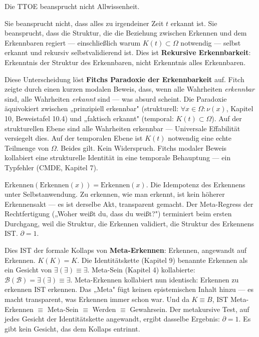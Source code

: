 \documentclass[10pt, openany, oneside]{book}
\begin{document}
\vspace{1em}

\noindent Die TTOE beansprucht nicht Allwissenheit.

Sie beansprucht nicht, dass alles zu irgendeiner Zeit $t$ erkannt ist. Sie beansprucht, dass die Struktur, die die Beziehung zwischen Erkennen und dem Erkennbaren regiert --- einschließlich warum $K(t) \subset \Omega$ notwendig --- selbst erkannt und rekursiv selbstvalidierend ist. Dies ist \textbf{Rekursive Erkennbarkeit}: Erkenntnis der Struktur des Erkennbaren, nicht Erkenntnis alles Erkennbaren.

Diese Unterscheidung löst \textbf{Fitchs Paradoxie der Erkennbarkeit} auf. Fitch zeigte durch einen kurzen modalen Beweis, dass, wenn alle Wahrheiten \textit{erkennbar} sind, alle Wahrheiten \textit{erkannt} sind --- was absurd scheint. Die Paradoxie äquivokiert zwischen „prinzipiell erkennbar" (strukturell: $\forall x \in \Omega: \nu(x)$, Kapitel 10, Beweistafel 10.4) und „faktisch erkannt" (temporal: $K(t) \subset \Omega$). Auf der strukturellen Ebene sind alle Wahrheiten erkennbar --- Universale Effabilität versiegelt dies. Auf der temporalen Ebene ist $K(t)$ notwendig eine echte Teilmenge von $\Omega$. Beides gilt. Kein Widerspruch. Fitchs modaler Beweis kollabiert eine strukturelle Identität in eine temporale Behauptung --- ein Typfehler (CMDE, Kapitel 7).

$\text{Erkennen}(\text{Erkennen}(x)) = \text{Erkennen}(x)$. Die Idempotenz des Erkennens unter Selbstanwendung. Zu erkennen, wie man erkennt, ist kein höherer Erkennensakt --- es ist derselbe Akt, transparent gemacht. Der Meta-Regress der Rechtfertigung („Woher weißt du, dass du weißt?") terminiert beim ersten Durchgang, weil die Struktur, die Erkennen validiert, die Struktur des Erkennens IST. $\partial = 1$.

Dies IST der formale Kollaps von \textbf{Meta-Erkennen}: Erkennen, angewandt auf Erkennen. $K(K) = K$. Die Identitätskette (Kapitel 9) benannte Erkennen als ein Gesicht von $\exists(\exists) \equiv \exists$. Meta-Sein (Kapitel 4) kollabierte: $\mathcal{B}(\mathcal{B}) = \exists(\exists) \equiv \exists$. Meta-Erkennen kollabiert nun identisch: Erkennen zu erkennen IST erkennen. Das „Meta" fügt keinen epistemischen Inhalt hinzu --- es macht transparent, was Erkennen immer schon war. Und da $K \equiv B$, IST Meta-Erkennen $\equiv$ Meta-Sein $\equiv$ Werden $\equiv$ Gewahrsein. Der metakursive Test, auf jedes Gesicht der Identitätskette angewandt, ergibt dasselbe Ergebnis: $\partial = 1$. Es gibt kein Gesicht, das dem Kollaps entrinnt.
\end{document}
